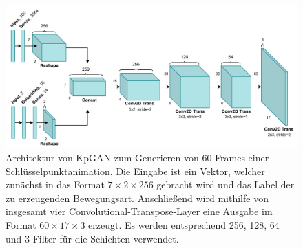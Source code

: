 \begin{figure}
    \includegraphics[width=\textwidth]{images/KpGAN.pdf}
    \caption{Architektur von KpGAN zum Generieren von 60 Frames einer
    Schlüs\-sel\-punkt\-anima\-tion. Die Eingabe ist ein Vektor, welcher
  zunächst in das Format $7 \times 2 \times 256$ gebracht wird und das Label
der zu erzeugenden Bewegungsart. Anschließend wird mithilfe von insgesamt vier
Convolutional-Transpose-Layer eine Ausgabe im Format $60 \times 17 \times 3$
erzeugt. Es werden entsprechend 256, 128, 64 und 3 Filter für die Schichten
verwendet.}
    \label{fig:kpgan}
\end{figure}

